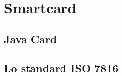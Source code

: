 \chapter{Smartcard}
\label{chapter2}



\section{Java Card}
\label{java_card}

\section{Lo standard ISO 7816}
\label{standard}
